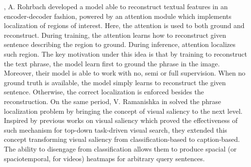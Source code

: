 \cite{rohrbach2016grounding}, A. Rohrbach \etal{} developed a model
able to reconstruct textual features in an encoder-decoder fashion,
powered by an attention module which implements localization of
regions of interest. Here, the attention is used to both ground and
reconstruct. During training, the attention learns how to reconstruct
given sentence describing the region to ground. During inference,
attention localizes such region. The key motivation under this idea is
that by training to reconstruct the text phrase, the model learn first
to ground the phrase in the image. Moreover, their model is able to
work with no, semi or full supervision. When no ground truth is
available, the model simply learns to reconstruct the given sentence.
Otherwise, the correct localization is enforced besides the
reconstruction. On the same period, V. Ramanishka \etal{} in
\cite{ramanishka2017top} solved the phrase localization problem by
bringing the concept of visual saliency to the next level. Inspired by
previous works on visual saliency which proved the effectiveness of
such mechanism for top-down task-driven visual search, they extended
this concept transforming visual saliency from classification-based to
caption-based. The ability to disengage from classification allows
them to produce spacial (or spaciotemporal, for videos) heatmaps for
arbitrary query sentences.

